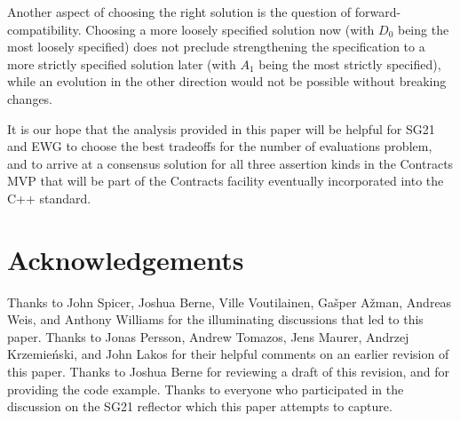 Another aspect of choosing the right solution is the question of forward-compatibility. Choosing a more loosely specified solution now (with $D_0$ being the most loosely specified) does not preclude strengthening the specification to a more strictly specified solution later (with $A_1$ being the most strictly specified), while an evolution in the other direction would not be possible without breaking changes.

It is our hope that the analysis provided in this paper will be helpful for SG21 and EWG to choose the best tradeoffs for the number of evaluations problem, and to arrive at a consensus solution for all three assertion kinds in the Contracts MVP that will be part of the Contracts facility eventually incorporated into the C++ standard.



\section*{Acknowledgements}
Thanks to John Spicer,  Joshua Berne, Ville Voutilainen, Ga\v sper A\v zman, Andreas Weis, and Anthony Williams for the illuminating discussions that led to this paper. Thanks to Jonas Persson, Andrew Tomazos, Jens Maurer, Andrzej Krzemie\' nski, and John Lakos for their helpful comments on an earlier revision of this paper. Thanks to Joshua Berne for reviewing a draft of this revision, and for providing the  code example. Thanks to everyone who participated in the discussion on the SG21 reflector which this paper attempts to capture.


\renewcommand{\addcontentsline}[3]{}%






